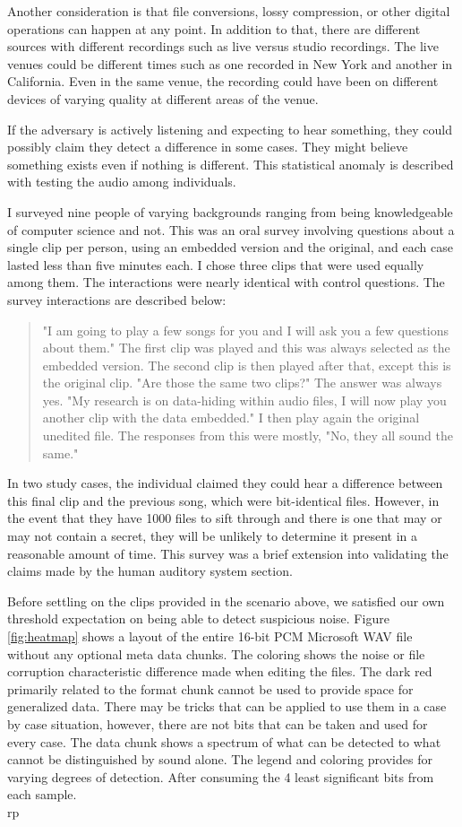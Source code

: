 \documentclass[letterpaper]{article}
\begin{document}
Another consideration is that file conversions, lossy compression, or other digital operations can happen at any point. In addition to that, there are different sources with different recordings such as live versus studio recordings. The live venues could be different times such as one recorded in New York and another in California. Even in the same venue, the recording could have been on different devices of varying quality at different areas of the venue. 

If the adversary is actively listening and expecting to hear something, they could possibly claim they detect a difference in some cases. They might believe something exists even if nothing is different. This statistical anomaly is described with testing the audio among individuals.

I surveyed nine people of varying backgrounds ranging from being knowledgeable of computer science and not. This was an oral survey involving questions about a single clip per person, using an embedded version and the original, and each case lasted less than five minutes each. I chose three clips that were used equally among them. The interactions were nearly identical with control questions. The survey interactions are described below:
\begin{quote}
"I am going to play a few songs for you and I will ask you a few questions about them." 
The first clip was played and this was always selected as the embedded version. The second clip is then played after that, except this is the original clip. "Are those the same two clips?" The answer was always yes. "My research is on data-hiding within audio files, I will now play you another clip with the data embedded." I then play again the original unedited file. The responses from this were mostly, "No, they all sound the same."   
\end{quote}
In two study cases, the individual claimed they could hear a difference between this final clip and the previous song, which were bit-identical files. However, in the event that they have 1000 files to sift through and there is one that may or may not contain a secret, they will be unlikely to determine it present in a reasonable amount of time. This survey was a brief extension into validating the claims made by the human auditory system section. 


Before settling on the clips provided in the scenario above, we satisfied our own threshold expectation on being able to detect suspicious noise. Figure \ref{fig:heatmap} shows a layout of the entire 16-bit PCM Microsoft WAV file without any optional meta data chunks. The coloring shows the noise or file corruption characteristic difference made when editing the files. The dark red primarily related to the format chunk cannot be used to provide space for generalized data. There may be tricks that can be applied to use them in a case by case situation, however, there are not bits that can be taken and used for every case. The data chunk shows a spectrum of what can be detected to what cannot be distinguished by sound alone. The legend and coloring provides for varying degrees of detection. After consuming the 4 least significant bits from each sample. \\rp
\end{document}
